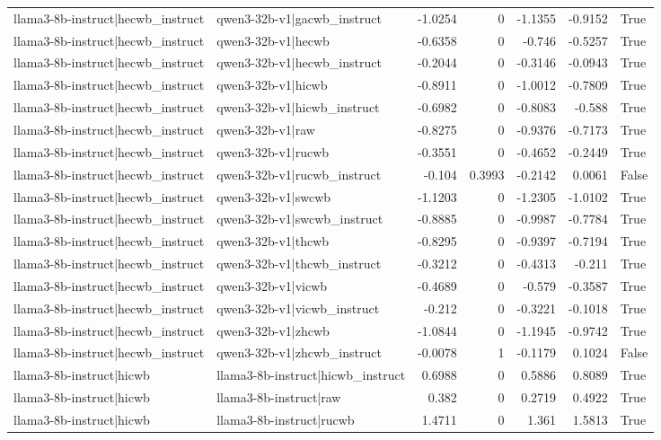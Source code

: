 \begin{table}
\begin{tabular}{l l r r r r l}
llama3-8b-instruct|hecwb_instruct & qwen3-32b-v1|gacwb_instruct & -1.0254 & 0 & -1.1355 & -0.9152 & True \\
llama3-8b-instruct|hecwb_instruct & qwen3-32b-v1|hecwb & -0.6358 & 0 & -0.746 & -0.5257 & True \\
llama3-8b-instruct|hecwb_instruct & qwen3-32b-v1|hecwb_instruct & -0.2044 & 0 & -0.3146 & -0.0943 & True \\
llama3-8b-instruct|hecwb_instruct & qwen3-32b-v1|hicwb & -0.8911 & 0 & -1.0012 & -0.7809 & True \\
llama3-8b-instruct|hecwb_instruct & qwen3-32b-v1|hicwb_instruct & -0.6982 & 0 & -0.8083 & -0.588 & True \\
llama3-8b-instruct|hecwb_instruct & qwen3-32b-v1|raw & -0.8275 & 0 & -0.9376 & -0.7173 & True \\
llama3-8b-instruct|hecwb_instruct & qwen3-32b-v1|rucwb & -0.3551 & 0 & -0.4652 & -0.2449 & True \\
llama3-8b-instruct|hecwb_instruct & qwen3-32b-v1|rucwb_instruct & -0.104 & 0.3993 & -0.2142 & 0.0061 & False \\
llama3-8b-instruct|hecwb_instruct & qwen3-32b-v1|swcwb & -1.1203 & 0 & -1.2305 & -1.0102 & True \\
llama3-8b-instruct|hecwb_instruct & qwen3-32b-v1|swcwb_instruct & -0.8885 & 0 & -0.9987 & -0.7784 & True \\
llama3-8b-instruct|hecwb_instruct & qwen3-32b-v1|thcwb & -0.8295 & 0 & -0.9397 & -0.7194 & True \\
llama3-8b-instruct|hecwb_instruct & qwen3-32b-v1|thcwb_instruct & -0.3212 & 0 & -0.4313 & -0.211 & True \\
llama3-8b-instruct|hecwb_instruct & qwen3-32b-v1|vicwb & -0.4689 & 0 & -0.579 & -0.3587 & True \\
llama3-8b-instruct|hecwb_instruct & qwen3-32b-v1|vicwb_instruct & -0.212 & 0 & -0.3221 & -0.1018 & True \\
llama3-8b-instruct|hecwb_instruct & qwen3-32b-v1|zhcwb & -1.0844 & 0 & -1.1945 & -0.9742 & True \\
llama3-8b-instruct|hecwb_instruct & qwen3-32b-v1|zhcwb_instruct & -0.0078 & 1 & -0.1179 & 0.1024 & False \\
llama3-8b-instruct|hicwb & llama3-8b-instruct|hicwb_instruct & 0.6988 & 0 & 0.5886 & 0.8089 & True \\
llama3-8b-instruct|hicwb & llama3-8b-instruct|raw & 0.382 & 0 & 0.2719 & 0.4922 & True \\
llama3-8b-instruct|hicwb & llama3-8b-instruct|rucwb & 1.4711 & 0 & 1.361 & 1.5813 & True \\

\end{tabular}
\end{table}
